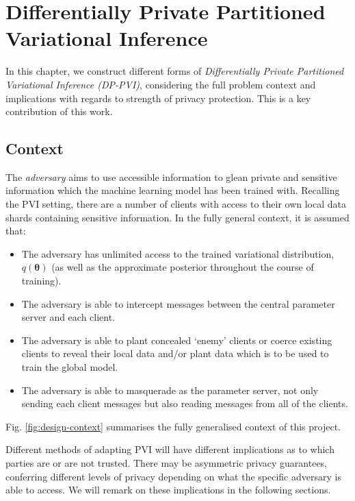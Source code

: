 
\chapter{Differentially Private Partitioned Variational Inference}
%
\graphicspath{{Design/Figs}}

In this chapter, we construct different forms of \emph{Differentially Private Partitioned Variational Inference (DP-PVI)}, considering the full problem context and implications with regards to strength of privacy protection. This is a key contribution of this work.  

\section{Context}
The \emph{adversary} aims to use accessible information to glean private and sensitive information which the machine learning model has been trained with.  Recalling the PVI setting, there are a number of clients with access to their own local data shards containing sensitive information.  In the fully general context, it is assumed that:
\begin{itemize}
	\item The adversary has unlimited access to the trained variational distribution, $q(\bm{\theta})$ (as well as the approximate posterior throughout the course of training).  
	\item The adversary is able to intercept messages between the central parameter server and each client. 
	\item The adversary is able to plant concealed `enemy' clients or coerce existing clients to reveal their local data and/or plant data which is to be used to train the global model. 
	\item The adversary is able to masquerade as the parameter server, not only sending each client messages but also reading messages from all of the clients. 
\end{itemize}
Fig. \ref{fig:design-context} summarises the fully generalised context of this project. 

Different methods of adapting PVI will have different implications as to which parties are or are not trusted. There may be asymmetric privacy guarantees, conferring different levels of privacy depending on what the specific adversary is able to access. We will remark on these implications in the following sections. 

